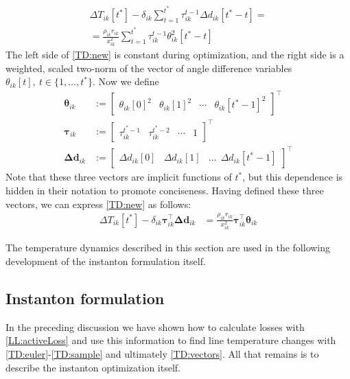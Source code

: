 \documentclass[conference]{IEEEtran}
\begin{document}
\begin{multline}
\label{TD:new}
\Delta T_{ik}[t^*] - \delta_{ik} \sum_{t=1}^{t^*}\tau_{ik}^{t-1}\Delta d_{ik} [t^* - t]  = \\
 = \frac{\rho_{ik}r_{ik}}{x_{ik}^2} \sum_{t=1}^{t^*} \tau_{ik}^{t-1}\theta_{ik}^2[t^* - t]
\end{multline}
The left side of \eqref{TD:new} is constant during optimization, and the right side is a weighted, scaled two-norm of the vector of angle difference variables $\theta_{ik}[t],~ t\in \{1,\ldots,t^*\}$. Now we define
\begin{align}
\boldsymbol{\theta}_{ik} &:= \begin{bmatrix}\theta_{ik}[0]^2 & \theta_{ik}[1]^2 & \cdots & \theta_{ik}[t^*-1]^2 \end{bmatrix}^\top \\
\boldsymbol{\tau}_{ik} &:= \begin{bmatrix} \tau_{ik}^{t^*-1} & \tau_{ik}^{t^*-2} & \cdots & 1 \end{bmatrix}^\top \\
\boldsymbol{\Delta d}_{ik} &:= \begin{bmatrix}
\Delta d_{ik}[0] & \Delta d_{ik}[1] & \ldots ~~ \Delta d_{ik}[t^*-1] 
\end{bmatrix}^\top
\end{align}
Note that these three vectors are implicit functions of $t^*$, but this dependence is hidden in their notation to promote conciseness. Having defined these three vectors, we can express \eqref{TD:new} as follows:
\begin{align}
\label{TD:vectors}
\Delta T_{ik}[t^*] - \delta_{ik} \boldsymbol{\tau}_{ik}^\top \boldsymbol{\Delta d}_{ik}  &= \frac{\rho_{ik}r_{ik}}{x_{ik}^2} \boldsymbol{\tau}_{ik}^\top \boldsymbol{\theta}_{ik}
\end{align}

The temperature dynamics described in this section are used in the following development of the instanton formulation itself.

\subsection{Instanton formulation}
In the preceding discussion we have shown how to calculate losses with \eqref{LL:activeLoss} and use this information to find line temperature changes with \eqref{TD:euler}-\eqref{TD:sample} and ultimately \eqref{TD:vectors}. All that remains is to describe the instanton optimization itself.
\end{document}
